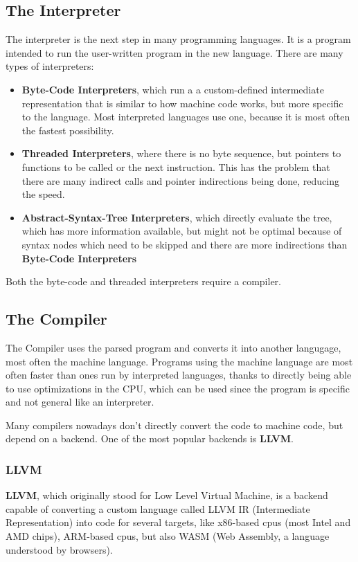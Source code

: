 \documentclass[12pt]{article}
\begin{document}
\subsection{The Interpreter}
The interpreter is the next step in many programming languages.
It is a program intended to run the user-written program in the new
language. There are many types of interpreters:
\begin{itemize}
      \item \textbf{Byte-Code Interpreters}, which run a
            a custom-defined intermediate representation that is similar to how
            machine code works, but more specific to the language. Most interpreted languages
            use one, because it is most often the fastest possibility.
      \item \textbf{Threaded Interpreters}, where there is no byte sequence, but pointers
            to functions to be called or the next instruction. This has the problem that there
            are many indirect calls and pointer indirections being done, reducing the speed.
      \item \textbf{Abstract-Syntax-Tree Interpreters}, which directly evaluate the tree,
            which has more information available, but might not be optimal because of syntax
            nodes which need to be skipped and there are more indirections than
            \textbf{Byte-Code Interpreters}
\end{itemize}
Both the byte-code and threaded interpreters require a compiler.

\subsection{The Compiler}
The Compiler uses the parsed program and converts it into another langugage,
most often the machine language. Programs using the machine language are most often
faster than ones run by interpreted languages, thanks to directly being able to use
optimizations in the CPU, which can be used since the program is specific
and not general like an interpreter.

Many compilers nowadays don't directly convert the code to machine code,
but depend on a backend. One of the most popular backends is \textbf{LLVM}.

\subsubsection{LLVM}
\textbf{LLVM}, which originally stood for Low Level Virtual Machine, is
a backend capable of converting a custom language called
LLVM IR (Intermediate Representation) into code for several targets,
like x86-based cpus (most Intel and AMD chips), ARM-based cpus, but also
WASM (Web Assembly, a language understood by browsers).
\end{document}
